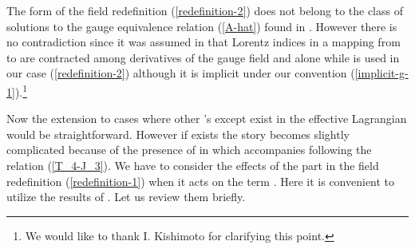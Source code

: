 \documentclass[a4paper,12pt]{article}
\begin{document}
The form of the field redefinition (\ref{redefinition-2})
does not belong to the class of solutions
to the gauge equivalence relation
(\ref{A-hat}) found in \cite{AK}.
However there is no contradiction
since it was assumed in \cite{AK} that
Lorentz indices in a mapping from \coordHE{} to \coordHE{}
are contracted among derivatives of the gauge field
and \coordHE{} alone
while \coordHE{} is used in our case (\ref{redefinition-2})
although it is implicit
under our convention (\ref{implicit-g-1}).\footnote{
We would like to thank I. Kishimoto for clarifying this point.
}


Now the extension to cases where other \coordHE{}'s except \coordHE{}
exist in the effective Lagrangian would be straightforward.
However if \coordHE{} exists the story becomes slightly complicated
because of the presence of \coordHE{} in \coordHE{}
which accompanies \coordHE{} following the relation (\ref{T_4-J_3}).
We have to consider the effects of the \coordHE{} part
in the field redefinition (\ref{redefinition-1})
when it acts on the \coordHE{} term \coordHE{}.
Here it is convenient to utilize the results of \cite{Okawa}.
Let us review them briefly.
\end{document}
